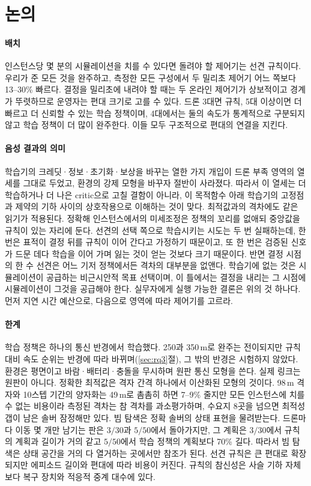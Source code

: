 \documentclass[final,5p,times,twocolumn]{elsarticle}
\begin{document}
\section{논의}
\label{sec:discussion}

\paragraph{배치}
인스턴스당 몇 분의 시뮬레이션을 치를 수 있다면 돌려야 할 제어기는 선견 규칙이다. 우리가 준 모든
것을 완주하고, 측정한 모든 구성에서 두 밀리초 제어기 어느 쪽보다 13--30\% 빠르다. 결정을 밀리초에
내려야 할 때는 두 온라인 제어기가 상보적이고 경계가 뚜렷하므로 운영자는 편대 크기로 고를 수 있다.
드론 3대면 규칙, 5대 이상이면 더 빠르고 더 신뢰할 수 있는 학습 정책이며, 4대에서는 둘의 속도가
통계적으로 구분되지 않고 학습 정책이 더 많이 완주한다. 이들 모두 구조적으로 편대의 연결을 지킨다.

\paragraph{음성 결과의 의미}
학습기의 크레딧·정보·초기화·보상을 바꾸는 열한 가지 개입이 드론 부족 영역의 열세를 그대로 두었고, 환경의
강제 모형을 바꾸자 절반이 사라졌다. 따라서 이 열세는 더 학습하거나 더 나은 critic으로 고칠 결함이
아니라, 이 목적함수 아래 학습기의 고정점과 제약의 기하 사이의 상호작용으로 이해하는 것이 맞다.
최적값과의 격차에도 같은 읽기가 적용된다. 정확해 인스턴스에서의 미세조정은 정책의 꼬리를 없애되
중앙값을 규칙이 있는 자리에 둔다. 선견의 선택 쪽으로 학습시키는 시도는 두 번 실패하는데, 한 번은
표적이 결정 뒤를 규칙이 이어 간다고 가정하기 때문이고, 또 한 번은 검증된 신호가 드문 데다 학습을
이어 가며 잃는 것이 얻는 것보다 크기 때문이다. 반면 결정 시점의 한 수 선견은 어느 기저 정책에서든
격차의 대부분을 없앤다. 학습기에 없는 것은 시뮬레이션이 공급하는 비근시안적 목표 선택이며, 이
틀에서는 결정을 내리는 그 시점에 시뮬레이션이 그것을 공급해야 한다. 실무자에게 실행 가능한 결론은
위의 것 하나다. 먼저 지연 시간 예산으로, 다음으로 영역에 따라 제어기를 고르라.

\paragraph{한계}
학습 정책은 하나의 통신 반경에서 학습했다. 250과 350\,m로 완주는 전이되지만 규칙 대비 속도
순위는 반경에 따라 바뀌며(\ref{sec:rq3}절), 그 밖의 반경은 시험하지 않았다. 환경은 평면이고
바람·배터리·충돌을 무시하며 원판 통신 모형을 쓴다. 실제 링크는 원판이 아니다. 정확한 최적값은 격자 간격 하나에서 이산화된
모형의 것이다. 98\,m 격자와 10스텝 기간의 양자화는 49\,m로 촘촘히 하면 7--9\% 줄지만 모든
인스턴스에 치를 수 없는 비용이라 측정된 격차는 참 격차를 과소평가하며, 수요지 8곳을 넘으면 최적성
갭이 남은 솔버 잠정해만 있다. 빔 탐색은 정확 솔버의 상태 표현을 물려받는다. 드론마다
이동 몇 개만 남기는 판은 $3/30$과 $5/50$에서 돌아가지만, 그 계획은 $3/30$에서 규칙의 계획과
길이가 거의 같고 $5/50$에서 학습 정책의 계획보다 70\% 길다. 따라서 빔 탐색은 상태 공간을 거의 다
열거하는 곳에서만 참조가 된다. 선견 규칙은 큰 편대로 확장되지만 에피소드 길이와 편대에 따라 비용이
커진다. 규칙의 참신성은 사슬 기하 자체보다
복구 장치와 적응적 중계 대수에 있다.
\end{document}
